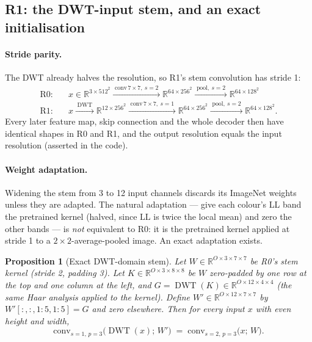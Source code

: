 \documentclass[11pt]{article}
\newtheorem{proposition}{Proposition}
\newcommand{\R}{\mathbb{R}}
\newcommand{\DWT}{\operatorname{DWT}}
\begin{document}
\subsection{R1: the DWT-input stem, and an exact initialisation}

\paragraph{Stride parity.} The DWT already halves the resolution, so R1's stem convolution has
stride 1:
\begin{align*}
  \text{R0:}&\quad x\in\R^{3\times512^2} \xrightarrow{\;\text{conv}\,7{\times}7,\ s=2\;} \R^{64\times256^2}
                  \xrightarrow{\;\text{pool},\ s=2\;} \R^{64\times128^2}\\
  \text{R1:}&\quad x \xrightarrow{\;\DWT\;} \R^{12\times256^2}
                  \xrightarrow{\;\text{conv}\,7{\times}7,\ s=1\;} \R^{64\times256^2}
                  \xrightarrow{\;\text{pool},\ s=2\;} \R^{64\times128^2}.
\end{align*}
Every later feature map, skip connection and the whole decoder then have identical shapes in R0
and R1, and the output resolution equals the input resolution (asserted in the code).

\paragraph{Weight adaptation.} Widening the stem from 3 to 12 input channels discards its
ImageNet weights unless they are adapted. The natural adaptation --- give each colour's LL band
the pretrained kernel (halved, since $\mathrm{LL}$ is twice the local mean) and zero the other
bands --- is \emph{not} equivalent to R0: it is the pretrained kernel applied at stride 1 to a
$2\times2$-average-pooled image. An exact adaptation exists.

\begin{proposition}[Exact DWT-domain stem]
\label{prop:exact}
Let $W\in\R^{O\times3\times7\times7}$ be R0's stem kernel (stride 2, padding 3). Let
$K\in\R^{O\times3\times8\times8}$ be $W$ zero-padded by one row at the top and one column at the
left, and $G = \DWT(K)\in\R^{O\times12\times4\times4}$ (the same Haar analysis applied to the
kernel). Define $W'\in\R^{O\times12\times7\times7}$ by $W'[:,:,1{:}5,1{:}5] = G$ and zero elsewhere.
Then for every input $x$ with even height and width,
\begin{equation}
  \mathrm{conv}_{s=1,\,p=3}\big(\DWT(x);\,W'\big) \;=\; \mathrm{conv}_{s=2,\,p=3}\big(x;\,W\big).
\end{equation}
\end{proposition}
\end{document}
